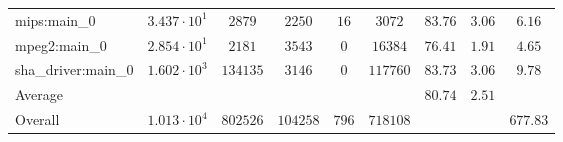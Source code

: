 \begin{tabular}{|l|c|c|c|c|c|c|c|c|}
mips:main\_0            & $ 3.437 \cdot 10^{1} $ & $ 2879   $ & $ 2250   $ & $ 16  $ & $ 3072   $ & $ 83.76       $ & $ 3.06    $ & $ 6.16    $ \\
mpeg2:main\_0           & $ 2.854 \cdot 10^{1} $ & $ 2181   $ & $ 3543   $ & $ 0   $ & $ 16384  $ & $ 76.41       $ & $ 1.91    $ & $ 4.65    $ \\
sha\_driver:main\_0     & $ 1.602 \cdot 10^{3} $ & $ 134135 $ & $ 3146   $ & $ 0   $ & $ 117760 $ & $ 83.73       $ & $ 3.06    $ & $ 9.78    $ \\
\hline
Average                 & $                    $ & $        $ & $        $ & $     $ & $        $ & $ 80.74       $ & $ 2.51    $ & $         $ \\
\hline
Overall                 & $ 1.013 \cdot 10^{4} $ & $ 802526 $ & $ 104258 $ & $ 796 $ & $ 718108 $ & $             $ & $         $ & $ 677.83  $ \\
\hline
\end{tabular}
